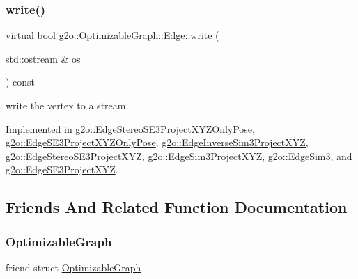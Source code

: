 \subsubsection{\texorpdfstring{write()}{write()}}
{\footnotesize\ttfamily virtual bool g2o\+::\+Optimizable\+Graph\+::\+Edge\+::write (\begin{DoxyParamCaption}\item[{std\+::ostream \&}]{os }\end{DoxyParamCaption}) const\hspace{0.3cm}{\ttfamily [pure virtual]}}



write the vertex to a stream 



Implemented in \mbox{\hyperlink{classg2o_1_1_edge_stereo_s_e3_project_x_y_z_only_pose_a8e7cb830d9d0d9675733294b692bd3d8}{g2o\+::\+Edge\+Stereo\+S\+E3\+Project\+X\+Y\+Z\+Only\+Pose}}, \mbox{\hyperlink{classg2o_1_1_edge_s_e3_project_x_y_z_only_pose_ac0132c975af1a49cdf490a6dbe8f450c}{g2o\+::\+Edge\+S\+E3\+Project\+X\+Y\+Z\+Only\+Pose}}, \mbox{\hyperlink{classg2o_1_1_edge_inverse_sim3_project_x_y_z_a71ce5fa6b21a59c0cfffdc2b7e8a2024}{g2o\+::\+Edge\+Inverse\+Sim3\+Project\+X\+YZ}}, \mbox{\hyperlink{classg2o_1_1_edge_stereo_s_e3_project_x_y_z_ad6d441e7c5858b4efa8392f9ed96b2bf}{g2o\+::\+Edge\+Stereo\+S\+E3\+Project\+X\+YZ}}, \mbox{\hyperlink{classg2o_1_1_edge_sim3_project_x_y_z_a9fe2dd1cff33b5c7d50d871b8e92bcc2}{g2o\+::\+Edge\+Sim3\+Project\+X\+YZ}}, \mbox{\hyperlink{classg2o_1_1_edge_sim3_ae1f72205352bf73156b70080ecfa235b}{g2o\+::\+Edge\+Sim3}}, and \mbox{\hyperlink{classg2o_1_1_edge_s_e3_project_x_y_z_ad2c5fe36901961700eaa9f38cc4b21ca}{g2o\+::\+Edge\+S\+E3\+Project\+X\+YZ}}.



\subsection{Friends And Related Function Documentation}
\mbox{\label{classg2o_1_1_optimizable_graph_1_1_edge_a45d35331ee3deca38c26d1efb6b961ae}} 
\subsubsection{\texorpdfstring{Optimizable\+Graph}{OptimizableGraph}}
{\footnotesize\ttfamily friend struct \mbox{\hyperlink{structg2o_1_1_optimizable_graph}{Optimizable\+Graph}}\hspace{0.3cm}{\ttfamily [friend]}}



